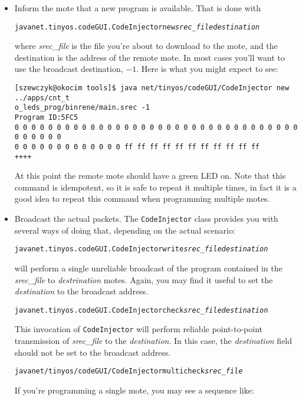 \documentclass[12pt,fullpage]{article}
\begin{document}
\begin{itemize}
\item Inform the mote that a new program is available. That is done with 
\begin{alltt} 
java net.tinyos.codeGUI.CodeInjector new {\em srec\_file} {\em destination}
\end{alltt}
where {\em srec\_file} is the file you're about to download to the mote, and
the destination is the address of the remote mote.  In most cases you'll want
to use the broadcast destination, $-1$. Here is what you might expect to see:
\begin{small}
\begin{verbatim}
[szewczyk@okocim tools]$ java net/tinyos/codeGUI/CodeInjector new ../apps/cnt_t
o_leds_prog/binrene/main.srec -1
Program ID:5FC5
0 0 0 0 0 0 0 0 0 0 0 0 0 0 0 0 0 0 0 0 0 0 0 0 0 0 0 0 0 0 0 0 0 0 0 0 0 0 0 0
0 0 0 0 0 0 0 0 0 0 0 0 0 ff ff ff ff ff ff ff ff ff ff ff
++++
\end{verbatim}
\end{small}

At this point the remote mote should have a green LED on. Note that this
command is idempotent, so it is safe to repeat it multiple times, in fact it
is a good idea to repeat this command when programming multiple motes.
\item Broadcast the actual packets. The {\tt CodeInjector} class provides you
with several ways of doing that, depending on the actual scenario:
\begin{alltt}
java net.tinyos.codeGUI.CodeInjector write {\em srec_file} {\em destination}
\end{alltt}
will perform a single unreliable broadcast of the program contained in the
{\em srec\_file} to {\em destrination} motes. Again, you may find it useful to set
the {\em destination} to the broadcast address. 
\begin{alltt}
java net.tinyos.codeGUI.CodeInjector check {\em srec_file} {\em destination}
\end{alltt}
This invocation of {\tt CodeInjector} will perform reliable point-to-point
transmission of {\em srec\_file} to the {\em destination}. In this case, the
{\em destination} field should not be set to the broadcast address.
\begin{alltt}
java net/tinyos/codeGUI/CodeInjector multicheck {\em srec_file} {} {}
\end{alltt}

If you're programming a single mote, you may see a sequence like:


\end{itemize}
\end{document}
